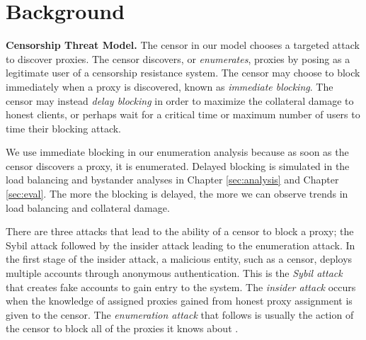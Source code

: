 \chapter{Background}
\label{sec:background}
\newtheorem{theorem}{Theorem}

\textbf{Censorship Threat Model.} The censor in our model chooses a targeted attack to discover proxies. The censor discovers, or \textit{enumerates}, proxies by posing as a legitimate user of a censorship resistance system. The censor may choose to block immediately when a proxy is discovered, known as \textit{immediate blocking}. The censor may instead \textit{delay blocking} in order to maximize the collateral damage to honest clients, or perhaps wait for  a critical time or maximum number of users to time their blocking attack.

We use immediate blocking in our enumeration analysis because as soon as the censor discovers a proxy, it is enumerated. Delayed blocking is simulated in the load balancing and bystander analyses in Chapter \ref{sec:analysis} and Chapter \ref{sec:eval}. The more the blocking is delayed, the more we can observe trends in load balancing and collateral damage.

There are three attacks that lead to the ability of a censor to block a proxy; the Sybil attack followed by the insider attack leading to the enumeration attack. In the first stage of the insider attack, a malicious entity, such as a censor, deploys multiple accounts through anonymous authentication. This is the \textit{Sybil attack} that creates fake accounts to gain entry to the system. The \textit{insider attack} occurs when the knowledge of assigned proxies gained from honest proxy assignment is given to the censor. The \textit{enumeration attack} that follows is usually the action of the censor to block all of the proxies it knows about \cite{wang2013rbridge}. 

